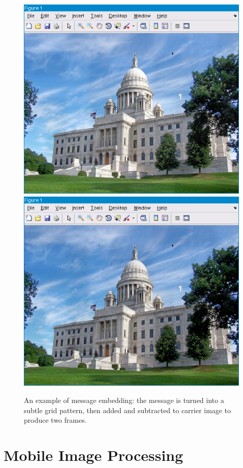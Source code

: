 \documentclass[11pt, letterpaper]{article}
\begin{document}
\begin{figure}[hbtp]
\centering
\includegraphics[scale=0.5]{img/message1.png}
\includegraphics[scale=0.5]{img/message2.png}
\caption{An example of message embedding: the message is turned into a subtle grid pattern, then added and subtracted to carrier image to produce two frames.}
\label{fig:message}
\end{figure}

\section{Mobile Image Processing}
\end{document}
